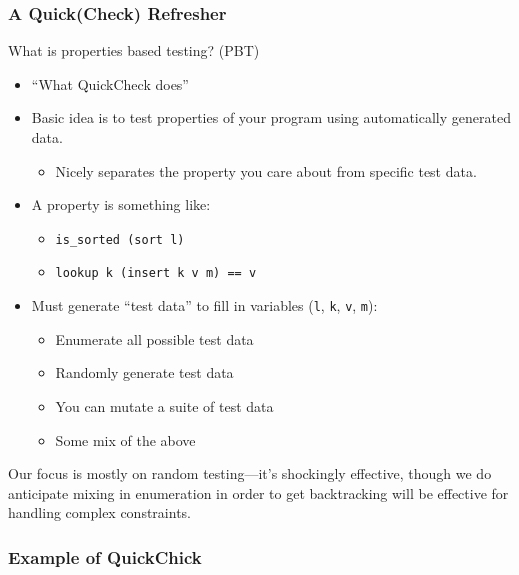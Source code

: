 \documentclass{beamer}
\begin{document}
\begin{frame}
  \frametitle{A Quick(Check) Refresher}

  What is properties based testing? (PBT)

  \begin{itemize}
  \item ``What QuickCheck does''
  \item Basic idea is to test properties of your program using
    automatically generated data.
    \begin{itemize}
    \item Nicely separates the property you care about from specific
      test data.
    \end{itemize}
  \item A property is something like:
    \begin{itemize}
    \item {\tt is\_sorted (sort l)}
    \item {\tt lookup k (insert k v m) == v}
    \end{itemize}
  \item Must generate ``test data'' to fill in variables ({\tt l}, {\tt k}, {\tt v}, {\tt m}):
    \begin{itemize}
    \item Enumerate all possible test data
    \item Randomly generate test data
    \item You can mutate a suite of test data~\cite{10.1145/3360607}
    \item Some mix of the above
    \end{itemize}
  \end{itemize}
  
  \pause
  
  Our focus is mostly on random testing---it's shockingly effective,
  though we do anticipate mixing in enumeration in order to get
  backtracking will be effective for handling complex constraints.
\end{frame}

\begin{frame}
  \frametitle{Example of QuickChick}


\end{frame}
\end{document}

